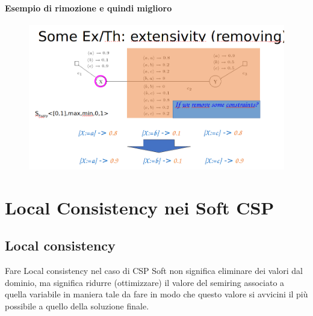 \subsubsection{Esempio di rimozione e quindi miglioro}
\begin{figure}[H]
    \centering
    \includegraphics[width=12.5cm, keepaspectratio]{img/Cap4/better2.png}
\end{figure}


\chapter{Local Consistency nei Soft CSP} \label{ch:Local Consistency nei Soft CSP}
\section{Local consistency}
Fare Local consistency nel caso di CSP Soft non significa eliminare dei valori dal dominio, ma significa ridurre (ottimizzare) il valore del semiring associato a quella variabile in maniera tale da fare in modo che questo valore si avvicini il più possibile a quello della soluzione finale.
